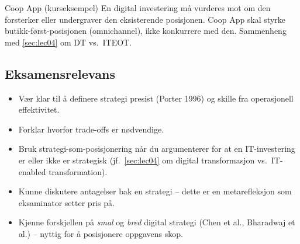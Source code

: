 \begin{eksempelboks}{Coop App (kurseksempel)}
En digital investering må vurderes mot om den forsterker eller undergraver
den eksisterende posisjonen. Coop App skal styrke butikk-først-posisjonen
(omnichannel), ikke konkurrere med den. Sammenheng med
\autoref{sec:lec04} om DT vs.\ ITEOT.
\end{eksempelboks}

\subsection{Eksamensrelevans}
\begin{itemize}
  \item Vær klar til å definere strategi presist (Porter 1996) og skille fra
    operasjonell effektivitet.
  \item Forklar hvorfor trade-offs er nødvendige.
  \item Bruk strategi-som-posisjonering når du argumenterer for at en
    IT-investering er eller ikke er strategisk (jf.\ \autoref{sec:lec04} om
    digital transformasjon vs.\ IT-enabled transformation).
  \item Kunne diskutere antagelser bak en strategi -- dette er en
    metarefleksjon som eksaminator setter pris på.
  \item Kjenne forskjellen på \emph{smal} og \emph{bred} digital strategi
    (Chen et al., Bharadwaj et al.) -- nyttig for å posisjonere oppgavens
    skop.
\end{itemize}
